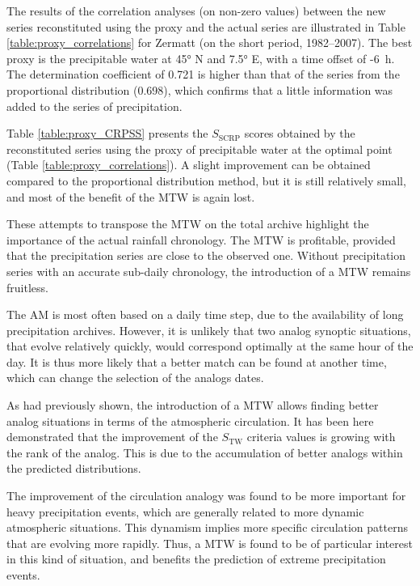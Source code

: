 \documentclass[hess, manuscript]{copernicus}
\begin{document}
The results of the correlation analyses (on non-zero values) between the new series reconstituted using the proxy and the actual series are illustrated in Table \ref{table:proxy_correlations} for Zermatt (on the short period, 1982--2007). The best proxy is the precipitable water at 45° N and 7.5° E, with a time offset of -6~h. The determination coefficient of 0.721 is higher than that of the series from the proportional distribution (0.698), which confirms that a little information was added to the series of precipitation.

Table \ref{table:proxy_CRPSS} presents the $S_{\text{SCRP}}$ scores obtained by the reconstituted series using the proxy of precipitable water at the optimal point (Table \ref{table:proxy_correlations}). A slight improvement can be obtained compared to the proportional distribution method, but it is still relatively small, and most of the benefit of the MTW is again lost.

These attempts to transpose the MTW on the total archive highlight the importance of the actual rainfall chronology. The MTW is profitable, provided that the precipitation series are close to the observed one. Without precipitation series with an accurate sub-daily chronology, the introduction of a MTW remains fruitless.


\conclusions  %

The AM is most often based on a daily time step, due to the availability of long precipitation archives. However, it is unlikely that two analog synoptic situations, that evolve relatively quickly, would correspond optimally at the same hour of the day. It is thus more likely that a better match can be found at another time, which can change the selection of the analogs dates.

As \citet{Finet2008} had previously shown, the introduction of a MTW allows finding better analog situations in terms of the atmospheric circulation. It has been here demonstrated that the improvement of the $S_{\text{TW}}$ criteria values is growing with the rank of the analog. This is due to the accumulation of better analogs within the predicted distributions.

The improvement of the circulation analogy was found to be more important for heavy precipitation events, which are generally related to more dynamic atmospheric situations. This dynamism implies more specific circulation patterns that are evolving more rapidly. Thus, a MTW is found to be of particular interest in this kind of situation, and benefits the prediction of extreme precipitation events.
\end{document}
